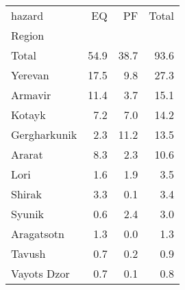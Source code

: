 \begin{tabular}{lrrr}
\toprule
hazard &    EQ &    PF &  Total \\
Region       &       &       &        \\
\midrule
Total        &  54.9 &  38.7 &   93.6 \\
Yerevan      &  17.5 &   9.8 &   27.3 \\
Armavir      &  11.4 &   3.7 &   15.1 \\
Kotayk       &   7.2 &   7.0 &   14.2 \\
Gergharkunik &   2.3 &  11.2 &   13.5 \\
Ararat       &   8.3 &   2.3 &   10.6 \\
Lori         &   1.6 &   1.9 &    3.5 \\
Shirak       &   3.3 &   0.1 &    3.4 \\
Syunik       &   0.6 &   2.4 &    3.0 \\
Aragatsotn   &   1.3 &   0.0 &    1.3 \\
Tavush       &   0.7 &   0.2 &    0.9 \\
Vayots Dzor  &   0.7 &   0.1 &    0.8 \\
\bottomrule
\end{tabular}
